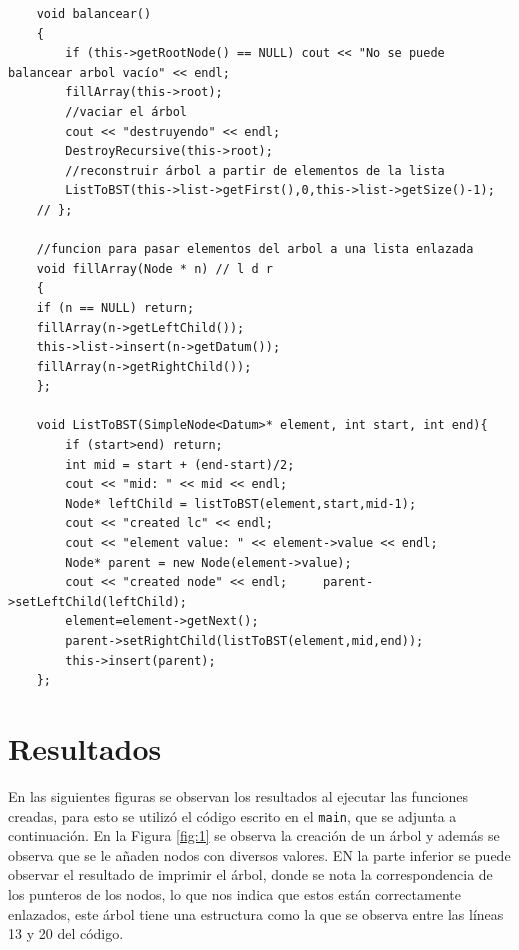 \begin{itemize}
    \begin{verbatim}
    void balancear()
    {
	    if (this->getRootNode() == NULL) cout << "No se puede balancear arbol vacío" << endl;
		fillArray(this->root);
		//vaciar el árbol
		cout << "destruyendo" << endl;
		DestroyRecursive(this->root);
		//reconstruir árbol a partir de elementos de la lista
		ListToBST(this->list->getFirst(),0,this->list->getSize()-1);
    // };
    
    //funcion para pasar elementos del arbol a una lista enlazada
    void fillArray(Node * n) // l d r
    {
    if (n == NULL) return;
    fillArray(n->getLeftChild());
    this->list->insert(n->getDatum());
    fillArray(n->getRightChild());
    };
    
    void ListToBST(SimpleNode<Datum>* element, int start, int end){
		if (start>end) return;
		int mid = start + (end-start)/2;
		cout << "mid: " << mid << endl;
		Node* leftChild = listToBST(element,start,mid-1);
		cout << "created lc" << endl;
		cout << "element value: " << element->value << endl;
		Node* parent = new Node(element->value);
		cout << "created node" << endl;		parent->setLeftChild(leftChild);
		element=element->getNext();
		parent->setRightChild(listToBST(element,mid,end));
		this->insert(parent);
	};
    \end{verbatim}
    
\end{itemize}


\section{Resultados}

En las siguientes figuras se observan los resultados al ejecutar las funciones creadas, para esto se utilizó el código escrito en el \texttt{main}, que se adjunta a continuación. En la Figura \ref{fig:1} se observa la creación de un árbol y además se observa que se le añaden nodos con diversos valores. EN la parte inferior se puede observar el resultado de imprimir el árbol, donde se nota la correspondencia de los punteros de los nodos, lo que nos indica que estos están correctamente enlazados, este árbol tiene una estructura como la que se observa entre las líneas 13 y 20 del código.



